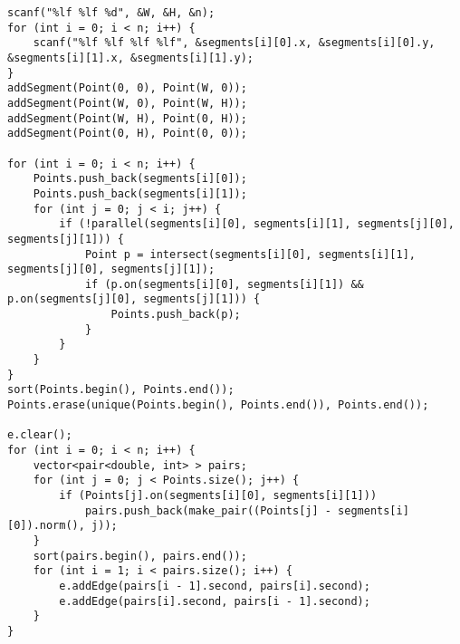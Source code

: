 \begin{lstlisting}
scanf("%lf %lf %d", &W, &H, &n);
for (int i = 0; i < n; i++) {
	scanf("%lf %lf %lf %lf", &segments[i][0].x, &segments[i][0].y, &segments[i][1].x, &segments[i][1].y);
}
addSegment(Point(0, 0), Point(W, 0));
addSegment(Point(W, 0), Point(W, H));
addSegment(Point(W, H), Point(0, H));
addSegment(Point(0, H), Point(0, 0));

for (int i = 0; i < n; i++) {
	Points.push_back(segments[i][0]);
	Points.push_back(segments[i][1]);
	for (int j = 0; j < i; j++) {
		if (!parallel(segments[i][0], segments[i][1], segments[j][0], segments[j][1])) {
			Point p = intersect(segments[i][0], segments[i][1], segments[j][0], segments[j][1]);
			if (p.on(segments[i][0], segments[i][1]) && p.on(segments[j][0], segments[j][1])) {
				Points.push_back(p);
			}
		}
	}
}
sort(Points.begin(), Points.end());
Points.erase(unique(Points.begin(), Points.end()), Points.end());

e.clear();
for (int i = 0; i < n; i++) {
	vector<pair<double, int> > pairs;
	for (int j = 0; j < Points.size(); j++) {
		if (Points[j].on(segments[i][0], segments[i][1]))
			pairs.push_back(make_pair((Points[j] - segments[i][0]).norm(), j));
	}
	sort(pairs.begin(), pairs.end());
	for (int i = 1; i < pairs.size(); i++) {
		e.addEdge(pairs[i - 1].second, pairs[i].second);
		e.addEdge(pairs[i].second, pairs[i - 1].second);
	}
}

\end{lstlisting}

